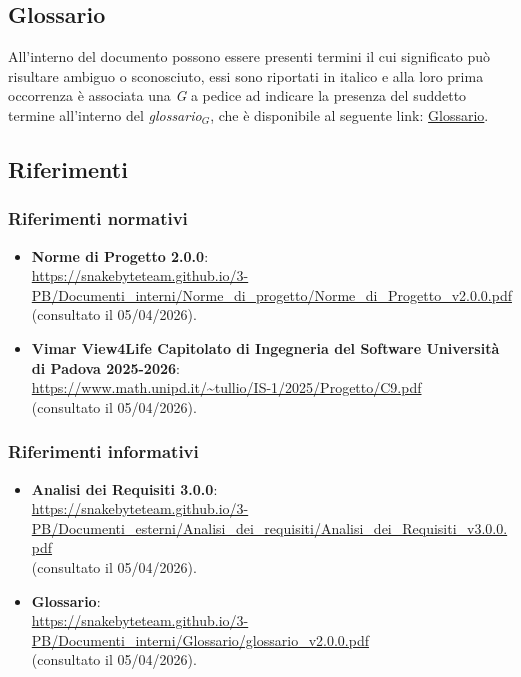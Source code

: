 \documentclass[10pt, letterpaper]{article}
\begin{document}
\subsection{Glossario}
All'interno del documento possono essere presenti termini il cui significato può risultare ambiguo o sconosciuto, essi sono
riportati in italico e alla loro prima occorrenza è associata una \textit{G} a pedice ad indicare la presenza del suddetto termine 
all'interno del \texorpdfstring{\textit{glossario}}{glossario}$_G$, che è disponibile al seguente link: \href{https://snakebyteteam.github.io/glossary.html}{Glossario}.

\subsection{Riferimenti}
\subsubsection{Riferimenti normativi}
\begin{itemize}
    \item \textbf{Norme di Progetto 2.0.0}:
          \\ \url{https://snakebyteteam.github.io/3-PB/Documenti_interni/Norme_di_progetto/Norme_di_Progetto_v2.0.0.pdf}
          \\ (consultato il 05/04/2026).
    \item \textbf{Vimar View4Life Capitolato di Ingegneria del Software Università di Padova 2025-2026}:
          \\ \url{https://www.math.unipd.it/~tullio/IS-1/2025/Progetto/C9.pdf}
          \\ (consultato il 05/04/2026).
\end{itemize}

\subsubsection{Riferimenti informativi}
\begin{itemize}
    \item \textbf{Analisi dei Requisiti 3.0.0}:
      \\ \url{https://snakebyteteam.github.io/3-PB/Documenti_esterni/Analisi_dei_requisiti/Analisi_dei_Requisiti_v3.0.0.pdf} 
      \\ (consultato il 05/04/2026).
    \item \textbf{Glossario}:
      \\ \url{https://snakebyteteam.github.io/3-PB/Documenti_interni/Glossario/glossario_v2.0.0.pdf} 
      \\ (consultato il 05/04/2026).
\end{itemize}
\end{document}
